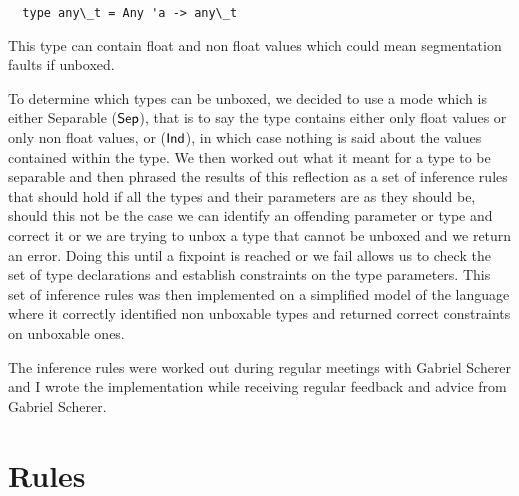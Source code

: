 \documentclass[a4]{article}
\begin{document}
\bigskip

\begin{lstlisting}
  type any\_t = Any 'a -> any\_t 
\end{lstlisting}
{\footnotesize This type can contain float and non float values which could mean segmentation faults if unboxed.}
\bigskip

To determine which types can be unboxed, we decided to use a mode which is either Separable ($\mathsf{Sep}$), that is to say the type contains either only float values or only non float values, or  ($\mathsf{Ind}$), in which case nothing is said about the values contained within the type.  We then worked out what it meant for a type to be separable and then phrased the results of this reflection as a set of inference rules that should hold if all the types and their parameters are as they should be, should this not be the case we can identify an offending parameter or type and correct it or we are trying to unbox a type that cannot be unboxed and we return an error. Doing this until a fixpoint is reached or we fail allows us to check the set of type declarations and establish constraints on the type parameters. This set of inference rules was then implemented on a simplified model of the language where it correctly identified non unboxable types and returned correct constraints on unboxable ones.

The inference rules were worked out during regular meetings with Gabriel Scherer and I wrote the implementation while receiving regular feedback and advice from Gabriel Scherer.

\section{Rules}
\end{document}
